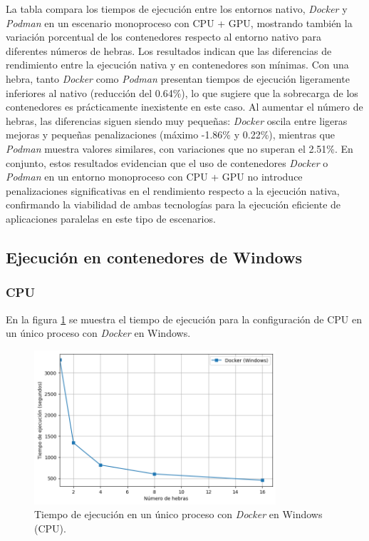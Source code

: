 La tabla compara los tiempos de ejecución entre los entornos nativo, \textit{Docker} y \textit{Podman} en un escenario monoproceso con CPU + GPU, mostrando también la variación porcentual de los contenedores respecto al entorno nativo para diferentes números de hebras. Los resultados indican que las diferencias de rendimiento entre la ejecución nativa y en contenedores son mínimas. Con una hebra, tanto \textit{Docker} como \textit{Podman} presentan tiempos de ejecución ligeramente inferiores al nativo (reducción del 0.64\%), lo que sugiere que la sobrecarga de los contenedores es prácticamente inexistente en este caso. Al aumentar el número de hebras, las diferencias siguen siendo muy pequeñas: \textit{Docker} oscila entre ligeras mejoras y pequeñas penalizaciones (máximo -1.86\% y 0.22\%), mientras que \textit{Podman} muestra valores similares, con variaciones que no superan el 2.51\%. En conjunto, estos resultados evidencian que el uso de contenedores \textit{Docker} o \textit{Podman} en un entorno monoproceso con CPU + GPU no introduce penalizaciones significativas en el rendimiento respecto a la ejecución nativa, confirmando la viabilidad de ambas tecnologías para la ejecución eficiente de aplicaciones paralelas en este tipo de escenarios.

\subsection{Ejecución en contenedores de Windows}
\subsubsection{CPU}

En la figura \ref{fig:single-node_windows_docker_time} se muestra el tiempo de ejecución para la configuración de CPU en un único proceso con \textit{Docker} en Windows.

\begin{figure}[H]
    \centering
    \includegraphics[width=0.8\textwidth]{imagenes/cap5/single-node_windows_docker_time.png}
    \caption{Tiempo de ejecución en un único proceso con \textit{Docker} en Windows (CPU).}
    \label{fig:single-node_windows_docker_time}
\end{figure}

